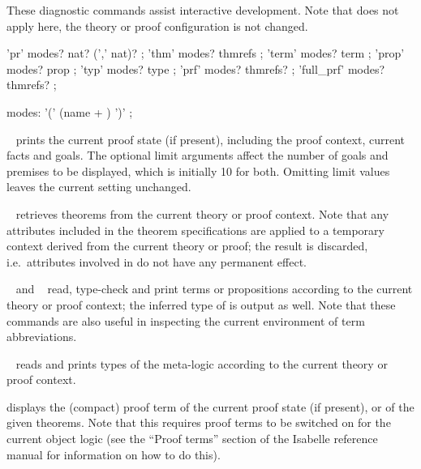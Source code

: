 \begin{isabellebody}
\begin{isamarkuptext}
  These diagnostic commands assist interactive development.  Note that
  \mbox{} does not apply here, the theory or proof
  configuration is not changed.

  \begin{rail}
    'pr' modes? nat? (',' nat)?
    ;
    'thm' modes? thmrefs
    ;
    'term' modes? term
    ;
    'prop' modes? prop
    ;
    'typ' modes? type
    ;
    'prf' modes? thmrefs?
    ;
    'full\_prf' modes? thmrefs?
    ;

    modes: '(' (name + ) ')'
    ;
  \end{rail}

  \begin{descr}

  \item [\mbox{\isa{\isacommand{pr}}}~\isa{{\isachardoublequote}goals{\isacharcomma}\ prems{\isachardoublequote}}] prints the current
  proof state (if present), including the proof context, current facts
  and goals.  The optional limit arguments affect the number of goals
  and premises to be displayed, which is initially 10 for both.
  Omitting limit values leaves the current setting unchanged.

  \item [\mbox{\isa{\isacommand{thm}}}~\isa{{\isachardoublequote}a\isactrlsub {\isadigit{1}}\ {\isasymdots}\ a\isactrlsub n{\isachardoublequote}}] retrieves
  theorems from the current theory or proof context.  Note that any
  attributes included in the theorem specifications are applied to a
  temporary context derived from the current theory or proof; the
  result is discarded, i.e.\ attributes involved in  do not have any permanent effect.

  \item [\mbox{\isa{\isacommand{term}}}~\isa{t} and \mbox{\isa{\isacommand{prop}}}~\isa{{\isasymphi}}]
  read, type-check and print terms or propositions according to the
  current theory or proof context; the inferred type of  is
  output as well.  Note that these commands are also useful in
  inspecting the current environment of term abbreviations.

  \item [\mbox{\isa{\isacommand{typ}}}~\isa{{\isasymtau}}] reads and prints types of the
  meta-logic according to the current theory or proof context.

  \item [\mbox{\isa{\isacommand{prf}}}] displays the (compact) proof term of the
  current proof state (if present), or of the given theorems. Note
  that this requires proof terms to be switched on for the current
  object logic (see the ``Proof terms'' section of the Isabelle
  reference manual for information on how to do this).


\end{descr}
\end{isamarkuptext}
\end{isabellebody}
